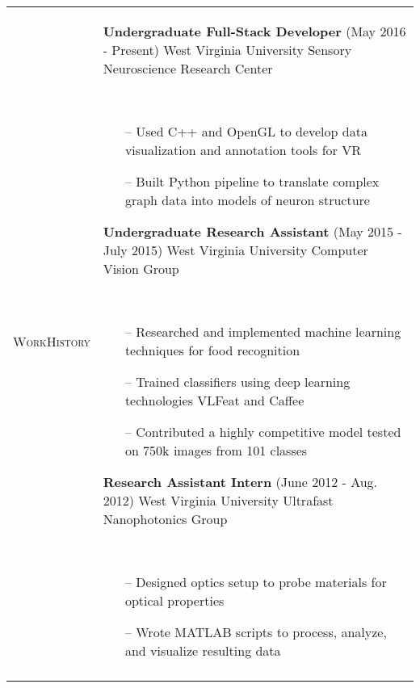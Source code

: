 \documentclass{article}
\begin{document}
\begin{tabular}{@{}p{2.5cm}@{\hspace{0.2cm}}p{13cm}@{}}
    \enspace\textsc{Work}\newline\textsc{History} &
    \enspace\textbf{Undergraduate Full-Stack Developer}
    \hfill\small(May 2016 - Present)\normalsize
    \newline West Virginia University Sensory Neuroscience Research Center
    \par\,\small
        \begin{itemize}[leftmargin=*,nolistsep,noitemsep]
        \item[--]Used C++ and OpenGL to develop data visualization and annotation tools for VR
        \item[--]Built Python pipeline to translate complex graph data into models of neuron structure
        \newline
        \end{itemize}
    \normalsize
    \textbf{Undergraduate Research Assistant}
    \hfill\small(May 2015 - July 2015)\normalsize
    \newline West Virginia University Computer Vision Group
    \par\,\small
        \begin{itemize}[leftmargin=*,nolistsep,noitemsep]
        \item[--]Researched and implemented machine learning techniques for food recognition
        \item[--]Trained classifiers using deep learning technologies VLFeat and Caffee
        \item[--]Contributed a highly competitive model tested on 750k images from 101 classes
        \newline
        \end{itemize}
    \normalsize
    \textbf{Research Assistant Intern}
    \hfill\small(June 2012 - Aug. 2012)\normalsize
    \newline West Virginia University Ultrafast Nanophotonics Group
    \par\,\small
      \begin{itemize}[leftmargin=*,nolistsep,noitemsep]
      \item[--]Designed optics setup to probe materials for optical properties
      \item[--]Wrote MATLAB scripts to process, analyze, and visualize resulting data
      \end{itemize}\\
    \normalsize


\end{tabular}
\end{document}
